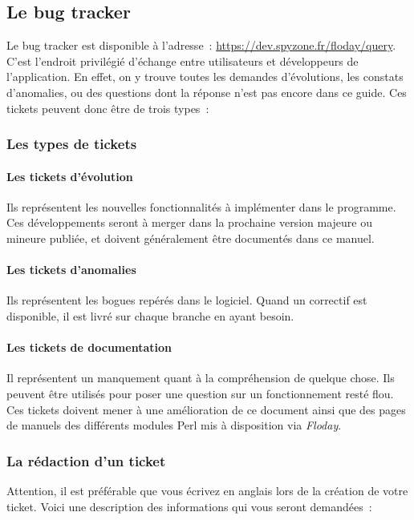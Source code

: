 \subsection{Le bug tracker}
\label{sec:contribution_bt}

Le bug tracker est disponible à l'adresse~: \url{https://dev.spyzone.fr/floday/query}.
C'est l'endroit privilégié d'échange entre utilisateurs et développeurs de l'application.
En effet, on y trouve toutes les demandes d'évolutions, les constats d'anomalies, ou des questions dont la réponse n'est pas encore dans ce guide.
Ces tickets peuvent donc être de trois types~:

\subsubsection{Les types de tickets}

\paragraph{Les tickets d'évolution} Ils représentent les nouvelles fonctionnalités à implémenter dans le programme. Ces développements seront à merger dans la prochaine version majeure ou mineure publiée, et doivent généralement être documentés dans ce manuel.
\paragraph{Les tickets d'anomalies} Ils représentent les bogues repérés dans le logiciel. Quand un correctif est disponible, il est livré sur chaque branche en ayant besoin.
\paragraph{Les tickets de documentation} Il représentent un manquement quant à la compréhension de quelque chose. Ils peuvent être utilisés pour poser une question sur un fonctionnement resté flou.
Ces tickets doivent mener à une amélioration de ce document ainsi que des pages de manuels des différents modules Perl mis à disposition via \emph{Floday}.

\subsubsection{La rédaction d'un ticket}

Attention, il est préférable que vous écrivez en anglais lors de la création de votre ticket.
Voici une description des informations qui vous seront demandées~:
\newline


